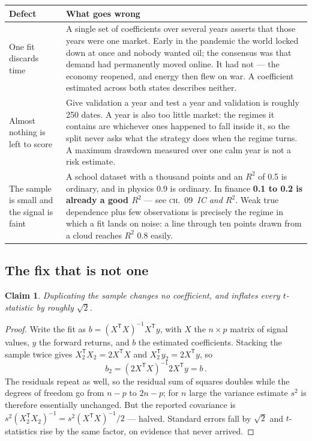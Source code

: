\documentclass[11pt]{article}
\theoremstyle{runin}
\newtheorem*{claim}{Claim}
\newcommand{\ch}[2]{\textsc{ch.~#1}~\textit{#2}}
\begin{document}
\begin{center}
\begin{tabularx}{\linewidth}{@{}L{3.4cm}X@{}}
\toprule
\textbf{Defect} & \textbf{What goes wrong} \\
\midrule
One fit discards time
& A single set of coefficients over several years asserts that those years were one market. Early
in the pandemic the world locked down at once and nobody wanted oil; the consensus was that demand
had permanently moved online. It had not --- the economy reopened, and energy then flew on war. A
coefficient estimated across both states describes neither. \\
\addlinespace
Almost nothing is left to score
& Give validation a year and test a year and validation is roughly 250 dates. A year is also too
little market: the regimes it contains are whichever ones happened to fall inside it, so the split
never asks what the strategy does when the regime turns. A maximum drawdown measured over one calm
year is not a risk estimate. \\
\addlinespace
The sample is small and the signal is faint
& A school dataset with a thousand points and an $R^2$ of 0.5 is ordinary, and in physics 0.9 is
ordinary. In finance \textbf{0.1 to 0.2 is already a good $R^2$} --- see \ch{09}{IC and $R^2$}.
Weak true dependence plus few observations is precisely the regime in which a fit lands on noise:
a line through ten points drawn from a cloud reaches $R^2$ 0.8 easily. \\
\bottomrule
\end{tabularx}
\end{center}

\subsection{The fix that is not one}
\label{sec:duplication}

\begin{claim}
Duplicating the sample changes no coefficient, and inflates every $t$-statistic by roughly
$\sqrt{2}$.
\end{claim}

\begin{proof}
Write the fit as $b = (X^{\mathsf{T}} X)^{-1} X^{\mathsf{T}} y$, with $X$ the $n \times p$ matrix
of signal values, $y$ the forward returns, and $b$ the estimated coefficients. Stacking the sample
twice gives $X_2^{\mathsf{T}} X_2 = 2 X^{\mathsf{T}} X$ and
$X_2^{\mathsf{T}} y_2 = 2 X^{\mathsf{T}} y$, so
\[
  b_2 = \left(2 X^{\mathsf{T}} X\right)^{-1} 2 X^{\mathsf{T}} y = b\,.
\]
The residuals repeat as well, so the residual sum of squares doubles while the degrees of freedom
go from $n - p$ to $2n - p$; for $n$ large the variance estimate $s^2$ is therefore essentially
unchanged. But the reported covariance is
$s^2 (X_2^{\mathsf{T}} X_2)^{-1} = s^2 (X^{\mathsf{T}} X)^{-1} / 2$ --- halved. Standard errors
fall by $\sqrt{2}$ and $t$-statistics rise by the same factor, on evidence that never arrived.
\end{proof}
\end{document}
